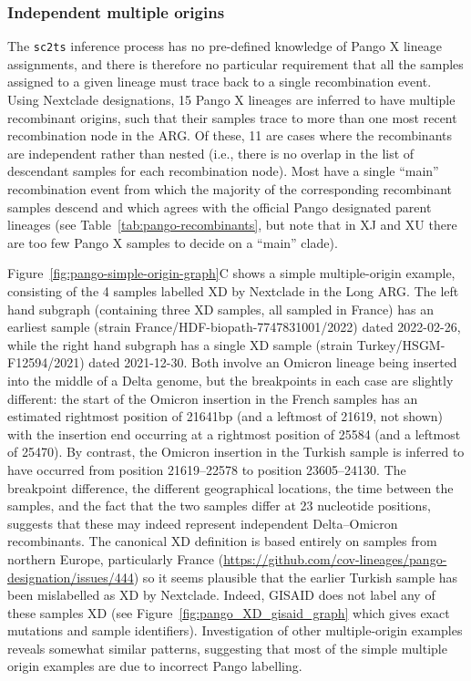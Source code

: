 \documentclass{article}
\begin{document}
\subsubsection{Independent multiple origins}
The \texttt{sc2ts} inference process has no pre-defined knowledge
of Pango X lineage assignments, and there is therefore no particular
requirement that all the samples assigned to a given lineage must trace back to
a single recombination event. Using Nextclade designations, 15 Pango X lineages are
inferred to have multiple
recombinant origins, such that their samples trace to more than one most recent
recombination node in the ARG. Of these, 11 are cases where the
recombinants are independent rather than nested (i.e., there is no overlap in the list
of descendant samples for each recombination node). Most have a single ``main''
recombination event from which the majority of the corresponding recombinant samples
descend and which agrees with the official Pango designated parent lineages
(see Table~\ref{tab:pango-recombinants}, but note that
in XJ and XU there are too few Pango X samples to decide on a ``main'' clade).

Figure~\ref{fig:pango-simple-origin-graph}C shows a simple multiple-origin example, consisting of
the 4 samples labelled XD by Nextclade in the Long ARG. The left hand subgraph
(containing three XD samples, all sampled in France) has an earliest
sample (strain France/HDF-biopath-7747831001/2022) dated 2022-02-26, while the right hand
subgraph has a single XD sample (strain Turkey/HSGM-F12594/2021) dated 2021-12-30.
Both involve an Omicron lineage being inserted into the middle of a Delta genome, but
the breakpoints in each case are slightly different: the start of the Omicron insertion
in the French samples has an estimated rightmost position of 21641bp
(and a leftmost of 21619, not shown) with the insertion end occurring at a rightmost position of 25584
(and a leftmost of 25470). By contrast, the Omicron insertion in the Turkish sample
is inferred to have occurred from position 21619--22578 to position 23605--24130.
The breakpoint difference, the different geographical locations, the time between the
samples, and the fact that the two samples differ at 23 nucleotide positions,
suggests that these may indeed represent independent Delta--Omicron recombinants.
The canonical XD definition is based entirely on samples from northern Europe, particularly
France (\url{https://github.com/cov-lineages/pango-designation/issues/444}) so it seems
plausible that the earlier Turkish sample has been mislabelled as XD by Nextclade.
Indeed, GISAID does not label any of these samples XD (see
Figure~\ref{fig:pango_XD_gisaid_graph} which gives exact mutations and sample identifiers).
Investigation of other multiple-origin examples reveals somewhat similar patterns,
suggesting that most of the simple multiple origin examples are due to incorrect
Pango labelling.
\end{document}
